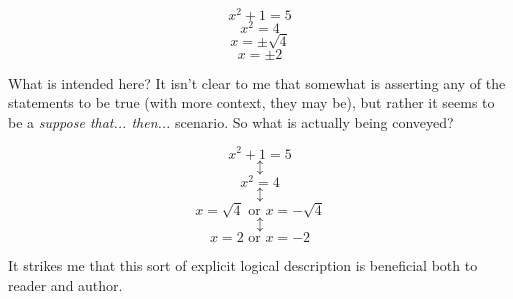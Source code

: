 $$x^2 +1 = 5$$
$$x^2 = 4$$
$$x = \pm \sqrt{4}$$
$$x = \pm 2$$

What is intended here? It isn't clear to me that somewhat is asserting any of the statements to be true (with more context, they may be), but rather it seems to be a \emph{suppose that... then...} scenario. So what is actually being conveyed?

$$x^2 +1 = 5$$
$$\updownarrow$$
$$x^2 = 4$$
$$\updownarrow$$
$$x =  \sqrt{4} \textrm{ or } x = - \sqrt{4}$$
$$\updownarrow$$
$$x =  2 \textrm{ or } x = -2$$

It strikes me that this sort of explicit logical description is beneficial both to reader and author.




